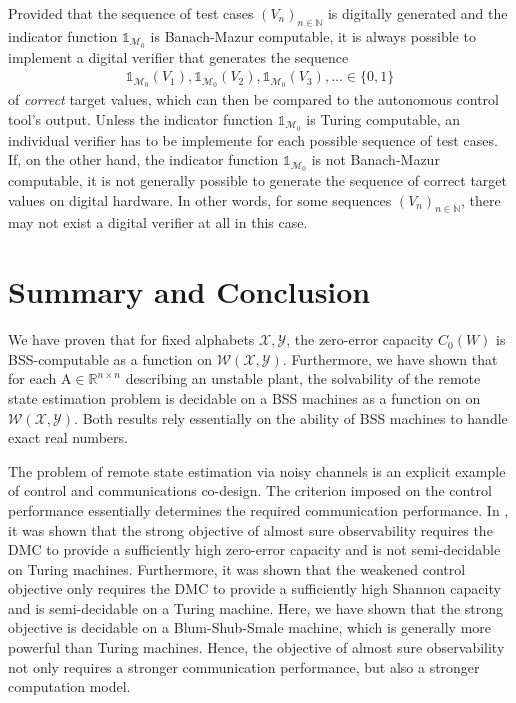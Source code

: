 \documentclass[conference]{IEEEtran}
\def\X{{\mathcal X}}
\def\Y{{\mathcal Y}}
\def\M{{\mathcal M}}
\def\W{{\mathcal W}}
\def\NN{{\mathbb N}}
\def\RR{{\mathbb R}}
\def\mA{\bm{\mathrm{A}}}
\newcommand{\tbr}[1]{}
\begin{document}
	Provided that the sequence of test cases \((V_n)_{n\in\NN}\) is digitally generated and the indicator function \(\mathds{1}_{\M_0}\) is Banach-Mazur computable, 
	it is always possible to implement a digital verifier that generates the sequence 
	\begin{align} 	\mathds{1}_{\M_0}(V_1), \mathds{1}_{\M_0}(V_2), \mathds{1}_{\M_0}(V_3),\ldots	\in \{0,1\} 
	\end{align}
	of \emph{correct} target values,
	which can then be compared to the autonomous control tool's output. Unless the indicator function \(\mathds{1}_{\M_0}\) is Turing computable, an individual verifier has to be implemente for each 
	possible sequence of test cases. If, on the other hand, the indicator function \(\mathds{1}_{\M_0}\) is not Banach-Mazur computable, it is not generally possible to generate the 
	sequence of correct target values on digital hardware. In other words, for some sequences \((V_n)_{n\in\NN}\), there may not exist a digital verifier at all in this case.
	
\section{Summary and Conclusion}	\label{sec:Conclusion}
	We have proven that for fixed alphabets \(\X,\Y\), the zero-error capacity \(C_0(W)\) is BSS-computable as a function on \(\W(\X,\Y)\).
	Furthermore, we have shown that for each \(\mA\in \RR^{n\times n}\) describing an unstable plant, the solvability of the remote state estimation
	problem is decidable on a BSS machines as a function on on \(\W(\X,\Y)\). Both results rely essentially on the ability of BSS machines to handle exact real numbers.
	
	The problem of remote state estimation via noisy channels is an explicit example of control and communications co-design. The criterion imposed on the control performance
	essentially determines the required communication performance. In \cite{MS07,BoBoDe21TAC}\tbr{{\color{red}\(\leftarrow\) Change to TAC!~}}, it was shown that the strong objective of almost sure observability requires the DMC to provide a sufficiently high
	zero-error capacity and is not semi-decidable on Turing machines. Furthermore, it was shown that the weakened control objective only requires the DMC to provide a sufficiently high
	Shannon capacity and is semi-decidable on a Turing machine. Here, we have shown that the strong objective is decidable on a Blum-Shub-Smale machine, which is generally more powerful than
	Turing machines. Hence, the objective of almost sure observability not only requires a stronger communication performance, but also a stronger computation model.
	
\end{document}
